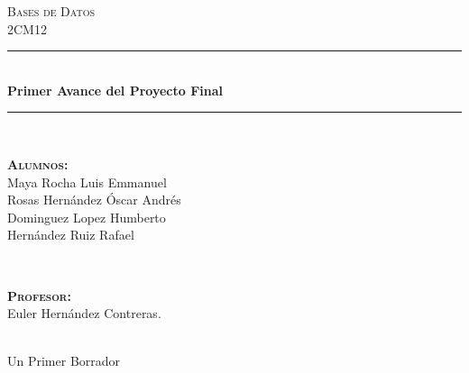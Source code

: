 \documentclass[12pt, fleqn]{article}                             %
\author{Oscar Andrés Rosas}                                     %
\begin{document}
\begin{titlepage}

    \center
    \textsc{\Large Bases de Datos}\\[0.5cm] 
    \textsc{\large 2CM12}\\[1.5cm]

    \rule{\linewidth}{0.5mm} \\[1.0cm]
        { \huge \bfseries Primer Avance del Proyecto Final}\\[1.0cm] 
    \rule{\linewidth}{0.5mm} \\[2.0cm]
     
    \begin{minipage}{0.4\textwidth}
        \begin{flushleft} \large
            \textbf{\textsc{Alumnos:}}\\
            \small{
                Maya Rocha Luis Emmanuel        \\
                Rosas Hernández Óscar Andrés    \\
                Dominguez Lopez Humberto        \\
                Hernández Ruiz Rafael
            }
        \end{flushleft}
    \end{minipage}
    ~
    \begin{minipage}{0.4\textwidth}
        \begin{flushright} \large
            \textbf{\textsc{Profesor: }}\\
            Euler Hernández Contreras.
        \end{flushright}
    \end{minipage}\\[3,5cm]

    {\LARGE Un Primer Borrador}\\[4cm] 
    

    \vfill

\end{titlepage}




\end{document}
